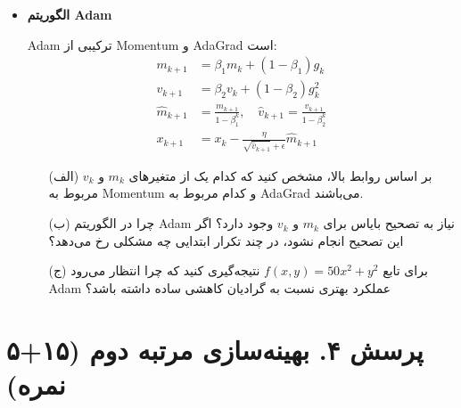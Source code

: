 \begin{itemize}
    الگوریتم RMSProp نسخه بهبودیافته AdaGrad است که به جای جمع کل گرادیان‌ها، از میانگین متحرک نمایی آن‌ها استفاده می‌کند:
    \begin{align*}
        s_{k+1} &= \gamma s_k + (1 - \gamma) g_k^2 \\
        x_{k+1} &= x_k - \frac{\eta}{\sqrt{s_{k+1}} + \epsilon} g_k
    \end{align*}
    که در آن $s_k$ میانگین متحرک نمایی مربع گرادیان‌ها و $\gamma \in [0, 1)$ ضریب کاهش است.
    \begin{itemize}
        \item[(الف)] استفاده از میانگین متحرک نمایی مربع گرادیان‌ها چه تفاوتی در مقایسه با AdaGrad ایجاد می‌کند؟ یک مزیت واضح RMSProp نسبت به AdaGrad را بیان کنید.
        \item[(ب)] نقش پارامتر $\gamma$ در RMSProp را با نقش $\beta$ در Momentum مقایسه کنید. هرکدام چه چیزی را کنترل می‌کنند؟
    \end{itemize}

    \item \textbf{الگوریتم Adam}
    
    Adam ترکیبی از Momentum و AdaGrad است:
    \begin{align*}
        m_{k+1} &= \beta_1 m_k + (1 - \beta_1) g_k \\
        v_{k+1} &= \beta_2 v_k + (1 - \beta_2) g_k^2 \\
        \hat{m}_{k+1} &= \frac{m_{k+1}}{1 - \beta_1^k}, \quad \hat{v}_{k+1} = \frac{v_{k+1}}{1 - \beta_2^k} \\
        x_{k+1} &= x_k - \frac{\eta}{\sqrt{\hat{v}_{k+1}} + \epsilon} \hat{m}_{k+1}
    \end{align*}
    \begin{itemize}
        \item[(الف)] بر اساس روابط بالا، مشخص کنید که کدام یک از متغیرهای $m_k$ و $v_k$ مربوط به Momentum و کدام مربوط به AdaGrad می‌باشند.
        \item[(ب)] چرا در الگوریتم Adam نیاز به تصحیح بایاس برای $m_k$ و $v_k$ وجود دارد؟ اگر این تصحیح انجام نشود، در چند تکرار ابتدایی چه مشکلی رخ می‌دهد؟
        \item[(ج)] برای تابع $f(x, y) = 50x^2 + y^2$ نتیجه‌گیری کنید که چرا انتظار می‌رود Adam عملکرد بهتری نسبت به گرادیان کاهشی ساده داشته باشد؟
    \end{itemize}
\end{itemize}

\section*{پرسش ۴. بهینه‌سازی مرتبه دوم (۱۵+۵ نمره)}

